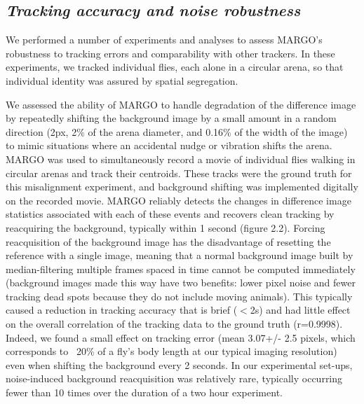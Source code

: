 \documentclass[12pt,letterpaper]{article}
\begin{document}
\subsection*{\textit{Tracking accuracy and noise robustness}}

We performed a number of experiments and analyses to assess MARGO's robustness to tracking errors and comparability with other trackers. In these experiments, we tracked individual flies, each alone in a circular arena, so that individual identity was assured by spatial segregation.

We assessed the ability of MARGO to handle degradation of the difference image by repeatedly shifting the background image by a small amount in a random direction (2px, 2\% of the arena diameter, and 0.16\% of the width of the image) to mimic situations where an accidental nudge or vibration shifts the arena. MARGO was used to simultaneously record a movie of individual flies walking in circular arenas and track their centroids. These tracks were the ground truth for this misalignment experiment, and background shifting was implemented digitally on the recorded movie. MARGO reliably detects the changes in difference image statistics associated with each of these events and recovers clean tracking by reacquiring the background, typically within 1 second (figure 2.2). Forcing reacquisition of the background image has the disadvantage of resetting the reference with a single image, meaning that a normal background image built by median-filtering multiple frames spaced in time cannot be computed immediately (background images made this way have two benefits: lower pixel noise and fewer tracking dead spots because they do not include moving animals). This typically caused a reduction in tracking accuracy that is brief ($<$2s) and had little effect on the overall correlation of the tracking data to the ground truth (r=0.9998). Indeed, we found a small effect on tracking error (mean 3.07+/- 2.5 pixels, which corresponds to ~20\% of a fly's body length at our typical imaging resolution) even when shifting the background every 2 seconds. In our experimental set-ups, noise-induced background reacquisition was relatively rare, typically occurring fewer than 10 times over the duration of a two hour experiment.
\end{document}
